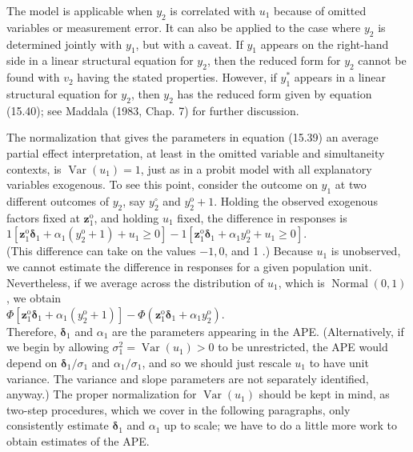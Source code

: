 \documentclass[10pt]{article}
\begin{document}
The model is applicable when $y_{2}$ is correlated with $u_{1}$ because of omitted variables or measurement error. It can also be applied to the case where $y_{2}$ is determined jointly with $y_{1}$, but with a caveat. If $y_{1}$ appears on the right-hand side in a linear structural equation for $y_{2}$, then the reduced form for $y_{2}$ cannot be found with $v_{2}$ having the stated properties. However, if $y_{1}^{*}$ appears in a linear structural equation for $y_{2}$, then $y_{2}$ has the reduced form given by equation (15.40); see Maddala (1983, Chap. 7) for further discussion.

The normalization that gives the parameters in equation (15.39) an average partial effect interpretation, at least in the omitted variable and simultaneity contexts, is $\operatorname{Var}\left(u_{1}\right)=1$, just as in a probit model with all explanatory variables exogenous. To see this point, consider the outcome on $y_{1}$ at two different outcomes of $y_{2}$, say $y_{2}^{\circ}$ and $y_{2}^{\mathrm{o}}+1$. Holding the observed exogenous factors fixed at $\mathbf{z}_{1}^{\mathrm{o}}$, and holding $u_{1}$ fixed, the difference in responses is\\
$1\left[\mathbf{z}_{1}^{\mathrm{o}} \boldsymbol{\delta}_{1}+\alpha_{1}\left(y_{2}^{\mathrm{o}}+1\right)+u_{1} \geq 0\right]-1\left[\mathbf{z}_{1}^{\mathrm{o}} \boldsymbol{\delta}_{1}+\alpha_{1} y_{2}^{\mathrm{o}}+u_{1} \geq 0\right]$.\\
(This difference can take on the values $-1,0$, and 1 .) Because $u_{1}$ is unobserved, we cannot estimate the difference in responses for a given population unit. Nevertheless, if we average across the distribution of $u_{1}$, which is $\operatorname{Normal}(0,1)$, we obtain\\
$\Phi\left[\mathbf{z}_{1}^{\mathrm{o}} \boldsymbol{\delta}_{1}+\alpha_{1}\left(y_{2}^{\mathrm{o}}+1\right)\right]-\Phi\left(\mathbf{z}_{1}^{\mathrm{o}} \boldsymbol{\delta}_{1}+\alpha_{1} y_{2}^{\mathrm{o}}\right)$.\\
Therefore, $\boldsymbol{\delta}_{1}$ and $\alpha_{1}$ are the parameters appearing in the APE. (Alternatively, if we begin by allowing $\sigma_{1}^{2}=\operatorname{Var}\left(u_{1}\right)>0$ to be unrestricted, the APE would depend on $\boldsymbol{\delta}_{1} / \sigma_{1}$ and $\alpha_{1} / \sigma_{1}$, and so we should just rescale $u_{1}$ to have unit variance. The variance and slope parameters are not separately identified, anyway.) The proper normalization for $\operatorname{Var}\left(u_{1}\right)$ should be kept in mind, as two-step procedures, which we cover in the following paragraphs, only consistently estimate $\boldsymbol{\delta}_{1}$ and $\alpha_{1}$ up to scale; we have to do a little more work to obtain estimates of the APE.
\end{document}
